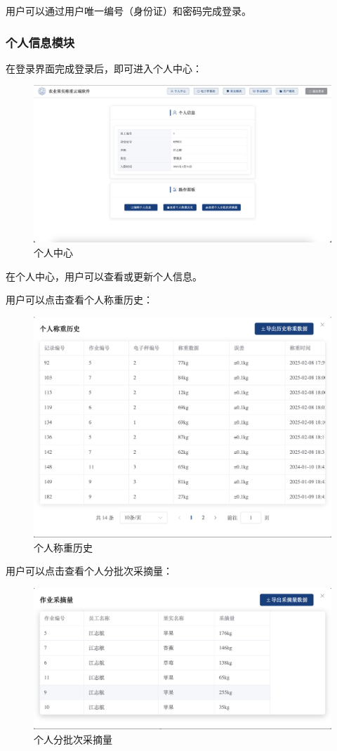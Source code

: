 \documentclass{xduugmr}
\begin{document}
用户可以通过用户唯一编号（身份证）和密码完成登录。

\subsubsection{个人信息模块}

在登录界面完成登录后，即可进入个人中心：

\begin{figure}[H]
    \centering
    \includegraphics[width=0.8\linewidth]{../result/个人中心.png}
    \caption{个人中心}
    \label{fig:个人中心}
\end{figure}

在个人中心，用户可以查看或更新个人信息。

用户可以点击查看个人称重历史：

\begin{figure}[H]
    \centering
    \includegraphics[width=0.8\linewidth]{../result/个人称重历史.png}
    \caption{个人称重历史}
    \label{fig:个人称重历史}
\end{figure}

用户可以点击查看个人分批次采摘量：

\begin{figure}[H]
    \centering
    \includegraphics[width=0.8\linewidth]{../result/个人分批次采摘量.png}
    \caption{个人分批次采摘量}
    \label{fig:个人分批次采摘量}
\end{figure}
\end{document}
